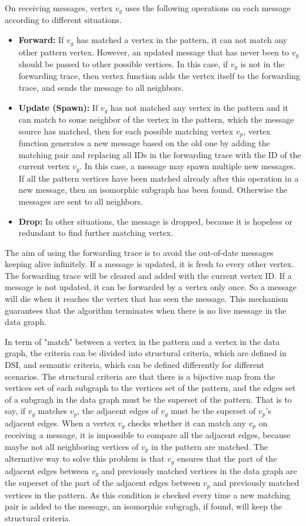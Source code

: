 On receiving messages, vertex $v_g$ uses the following operations on each message according to different situations. 
	\begin{itemize}
	\item \textbf{Forward:} If $v_g$ has matched a vertex in the pattern, it can not match any other pattern vertex. However, an updated message that has never been to $v_g$ should be passed to other possible vertices. In this case, if $v_g$ is not in the forwarding trace, then vertex function adds the vertex itself to the forwarding trace, and sends the message to all neighbors.
	\item \textbf{Update (Spawn):} If $v_g$ has not matched any vertex in the pattern and it can match to some neighbor of the vertex in the pattern, which the message source has matched, then for each possible matching vertex $v_p$, vertex function generates a new message based on the old one by adding the matching pair and replacing all IDs in the forwarding trace with the ID of the current vertex $v_g$. In this case, a message may spawn multiple new messages. If all the pattern vertices have been matched already after this operation in a new message, then an isomorphic subgraph has been found. Otherwise the messages are sent to all neighbors.
	\item \textbf{Drop:} In other situations, the message is dropped, because it is hopeless or redundant to find further matching vertex.
	\end{itemize}

The aim of using the forwarding trace is to avoid the out-of-date messages keeping alive infinitely. If a message is updated, it is fresh to every other vertex. The forwarding trace will be cleared and added with the current vertex ID. If a message is not updated, it can be forwarded by a vertex only once. So a message will die when it reaches the vertex that has seen the message. This mechanism guarantees that the algorithm terminates when there is no live message in the data graph.

In term of "match" between a vertex in the pattern and a vertex in the data graph, the criteria can be divided into structural criteria, which are defined in DSI, and semantic criteria, which can be defined differently for different scenarios. The structural criteria are that there is a bijective map from the vertices set of each subgraph to the vertices set of the pattern, and the edges set of a subgragh in the data graph must be the superset of the pattern. That is to say, if $v_g$ matches $v_p$, the adjacent edges of $v_g$ must be the superset of $v_p$'s adjacent edges. When a vertex $v_g$ checks whether it can match any $v_p$ on receiving a message, it is impossible to compare all the adjacent edges, because maybe not all neighboring vertices of $v_p$ in the pattern are matched. The alternative way to solve this problem is that $v_g$ ensures that the part of the adjacent edges between $v_g$ and previously matched vertices in the data graph are the superset of the part of the adjacent edges between $v_p$ and previously matched vertices in the pattern. As this condition is checked every time a new matching pair is added to the message, an isomorphic subgragh, if found, will keep the structural criteria.


